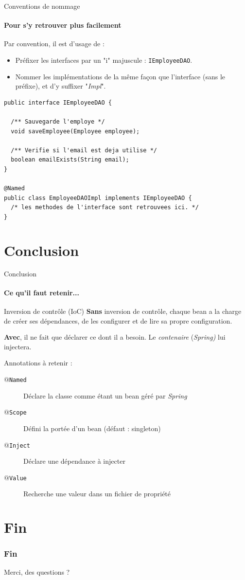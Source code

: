 \documentclass[compress]{beamer}%
\begin{document}
\begin{frame}[fragile]{Conventions de nommage}
	\framesubtitle{Pour s'y retrouver plus facilement}

	Par convention, il est d'usage de :
	\begin{itemize}
		\item Préfixer les interfaces par un "i" majuscule : \texttt{IEmployeeDAO}.
		\item Nommer les implémentations de la même façon que l'interface (sans le préfixe), et d'y suffixer "\emph{Impl}".
	\end{itemize}

	\pause

	\begin{lstlisting}
public interface IEmployeeDAO {

  /** Sauvegarde l'employe */
  void saveEmployee(Employee employee);

  /** Verifie si l'email est deja utilise */
  boolean emailExists(String email);
}

@Named
public class EmployeeDAOImpl implements IEmployeeDAO {
  /* les methodes de l'interface sont retrouvees ici. */
}
	\end{lstlisting}

\end{frame}


\section{Conclusion}

\begin{frame}{Conclusion}
	\framesubtitle{Ce qu'il faut retenir...}

	\begin{block}{Inversion de contrôle (IoC)}
		\textbf{Sans} inversion de contrôle, chaque bean a la charge de créer ses dépendances, de les configurer et de lire sa propre configuration.\par
		\textbf{Avec}, il ne fait que déclarer ce dont il a besoin. Le \emph{contenaire} (\emph{Spring)} lui injectera.
	\end{block}

	\pause
	Annotations à retenir :
	\begin{description}
		\item [\texttt{$@$Named}] Déclare la classe comme étant un bean géré par \emph{Spring}
		\item [\texttt{$@$Scope}] Défini la portée d'un bean (défaut : singleton)
		\item [\texttt{$@$Inject}] Déclare une dépendance à injecter
		\item [\texttt{$@$Value}] Recherche une valeur dans un fichier de propriété
	\end{description}

\end{frame}

\section*{Fin}

\begin{frame}
	\frametitle{Fin}
	\begin{center}
		\huge
		Merci, des questions ?
	\end{center}
\end{frame}
\end{document}
